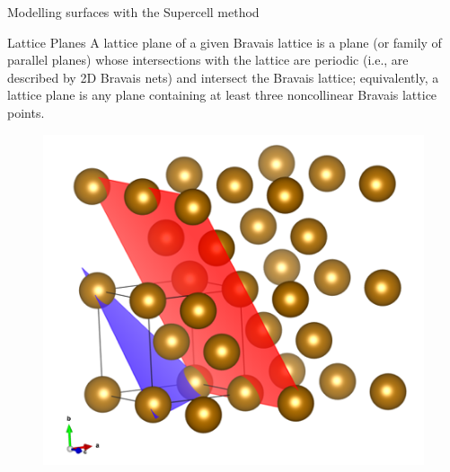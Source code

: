 \documentclass[aspectratio=169]{beamer}
\begin{document}
    \begin{frame}{Modelling surfaces with the Supercell method}

        \begin{figure}
            \centering
        \end{figure}

    \end{frame}


    \begin{frame}{Lattice Planes}
        A lattice plane of a given Bravais lattice is a plane (or family of parallel planes) whose intersections with the lattice are periodic (i.e., are described by 2D Bravais nets) and intersect the Bravais lattice; equivalently, a lattice plane is any plane containing at least three noncollinear Bravais lattice points.
        \begin{figure}
            \centering
            \includegraphics[width=0.3\linewidth]{lectures/figures/11_lattice_planes.png}
        \end{figure}
    \end{frame}
\end{document}
